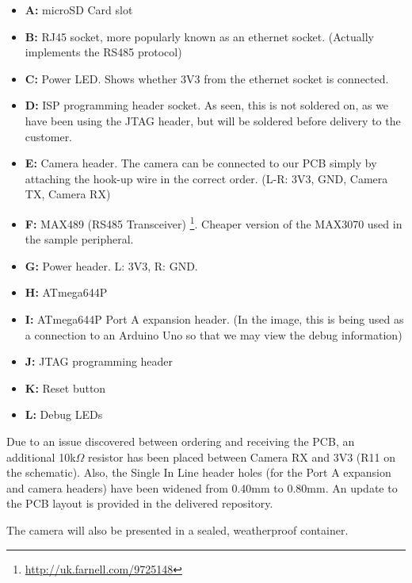 \begin{itemize}
\item \textbf{A:} microSD Card slot
\item \textbf{B:} RJ45 socket, more popularly known as an ethernet socket. 
(Actually implements the RS485 protocol)
\item \textbf{C:} Power LED. Shows whether 3V3 from the ethernet socket is connected.
\item \textbf{D:} ISP programming header socket. As seen, this is not 
soldered on, as we have been using the JTAG header, but will be soldered 
before delivery to the customer.
\item \textbf{E:} Camera header. The camera can be connected to our PCB 
simply by attaching the hook-up wire in the correct order. (L-R: 3V3, GND, 
Camera TX, Camera RX)
\item \textbf{F:} MAX489 (RS485 Transceiver) \footnote{\url{http://uk.farnell.com/9725148}}. 
Cheaper version of the MAX3070 used in the sample peripheral.
\item \textbf{G:} Power header. L: 3V3, R: GND.
\item \textbf{H:} ATmega644P \cite{atmega644p}
\item \textbf{I:} ATmega644P Port A expansion header. (In the image, this is 
being used as a connection to an Arduino Uno so that we may view the debug 
information)
\item \textbf{J:} JTAG programming header
\item \textbf{K:} Reset button
\item \textbf{L:} Debug LEDs
\end{itemize}

Due to an issue discovered between ordering and receiving the PCB, an 
additional 10k$\Omega$ resistor has been placed between Camera RX and 3V3 (R11 
on the schematic). Also, the Single In Line header holes (for the Port A 
expansion and camera headers) have been widened from 0.40mm to 0.80mm. An 
update to the PCB layout is provided in the delivered repository.

The camera will also be presented in a sealed, weatherproof container.
